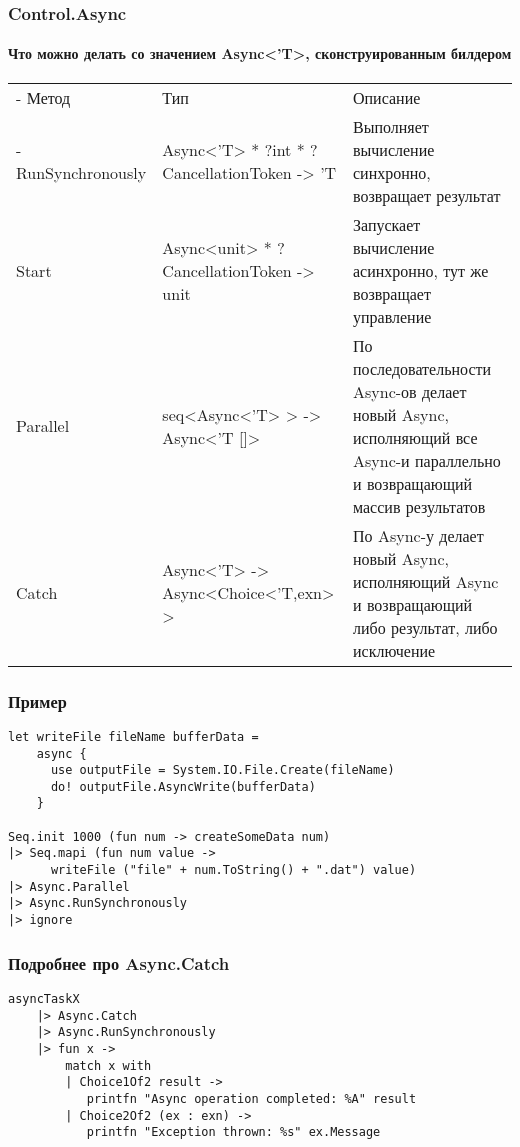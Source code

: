 \documentclass[xetex,mathserif,serif]{beamer}
\begin{document}
	\begin{frame}
		\frametitle{Control.Async}
		\framesubtitle{Что можно делать со значением Async<'T>, сконструированным билдером}
		\begin{footnotesize}
			\begin{tabu} {| X[0.7 l p] | X[1 l p] | X[1 l p] |}
				\tabucline-
				Метод              & Тип                                         & Описание           \\
				\tabucline-
				\everyrow{\tabucline-}
				RunSynchronously   & Async<'T> * ?int * ?CancellationToken -> 'T & Выполняет вычисление синхронно, возвращает результат \\
				Start              & Async<unit> * ?CancellationToken -> unit    & Запускает вычисление асинхронно, тут же возвращает управление \\
				Parallel           & seq<Async<'T> > -> Async<'T []>             & По последовательности Async-ов делает новый Async, исполняющий все Async-и параллельно и возвращающий массив результатов \\
				Catch              & Async<'T> -> Async<Choice<'T,exn> >         & По Async-у делает новый Async, исполняющий Async и возвращающий либо результат, либо исключение \\
			\end{tabu}
		\end{footnotesize}
	\end{frame}

	\begin{frame}[fragile]
		\frametitle{Пример}
		\begin{verbatim}
let writeFile fileName bufferData =
    async {
      use outputFile = System.IO.File.Create(fileName)
      do! outputFile.AsyncWrite(bufferData) 
    }

Seq.init 1000 (fun num -> createSomeData num)
|> Seq.mapi (fun num value -> 
      writeFile ("file" + num.ToString() + ".dat") value)
|> Async.Parallel
|> Async.RunSynchronously
|> ignore
		\end{verbatim}
\end{frame}

	\begin{frame}[fragile]
		\frametitle{Подробнее про Async.Catch}
		\begin{verbatim}
asyncTaskX
    |> Async.Catch
    |> Async.RunSynchronously
    |> fun x ->
        match x with
        | Choice1Of2 result -> 
           printfn "Async operation completed: %A" result
        | Choice2Of2 (ex : exn) -> 
           printfn "Exception thrown: %s" ex.Message
		\end{verbatim}
\end{frame}
	
\end{document}
